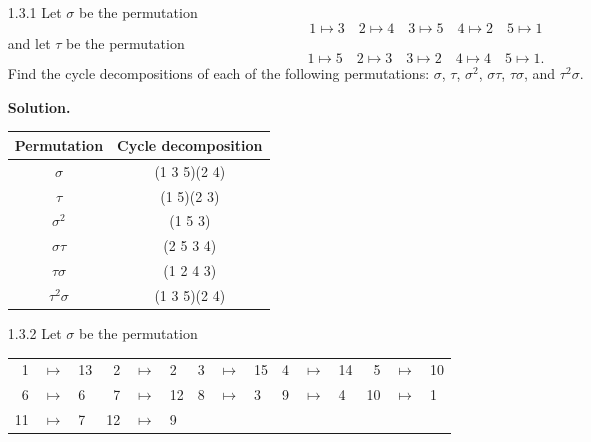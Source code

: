 \begin{enumerate}
   \item[1.3.1]   Let $\sigma$ be the permutation
                  $$1 \mapsto 3 \quad 2 \mapsto 4 \quad 3 \mapsto 5 \quad
                    4 \mapsto 2 \quad 5 \mapsto 1$$
                  and let $\tau$ be the permutation
                  $$1 \mapsto 5 \quad 2 \mapsto 3 \quad 3 \mapsto 2 \quad
                    4 \mapsto 4 \quad 5 \mapsto 1.$$
                  Find the cycle decompositions of each of the following
                  permutations: $\sigma$, $\tau$, $\sigma^2$, $\sigma\tau$,
                  $\tau\sigma$, and $\tau^2\sigma$.

      \textbf{Solution.}
      \begin{center}
         \begin{tabular}{@{}|c|c|@{}} \hline
            Permutation    & Cycle decomposition   \\ \hline
            $\sigma$       & (1 3 5)(2 4)          \\ \hline
            $\tau$         & (1 5)(2 3)            \\ \hline 
            $\sigma^2$     & (1 5 3)               \\ \hline
            $\sigma\tau$   & (2 5 3 4)             \\ \hline
            $\tau\sigma$   & (1 2 4 3)             \\ \hline
            $\tau^2\sigma$ & (1 3 5)(2 4)          \\ \hline
         \end{tabular}
      \end{center}
   \item[1.3.2]   Let $\sigma$ be the permutation
                  \begin{center}
                     \begin{tabular}{@{}rclrclrclrclrcl@{}}
                        1 & $\mapsto$ & 13 & 2 & $\mapsto$ & 2 &
                        3 & $\mapsto$ & 15 & 4 & $\mapsto$ & 14 &
                        5 & $\mapsto$ & 10 \\
                        6 & $\mapsto$ & 6 & 7 & $\mapsto$ & 12 &
                        8 & $\mapsto$ & 3 & 9 & $\mapsto$ & 4 &
                        10 & $\mapsto$ & 1 \\
                        11 & $\mapsto$ & 7 & 12 & $\mapsto$ & 9 &

\end{tabular}
\end{center}
\end{enumerate}
